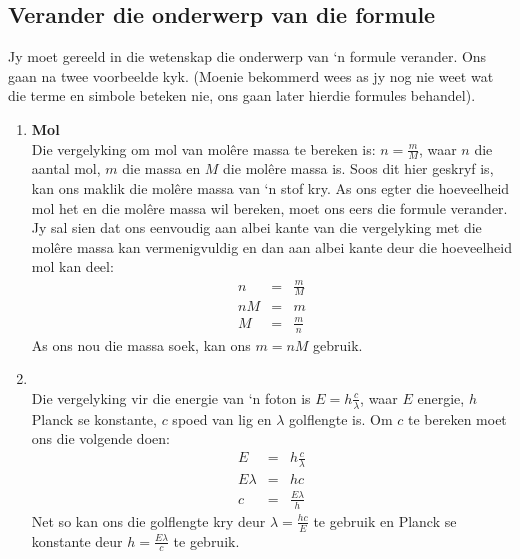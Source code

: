 \subsection*{Verander die onderwerp van die formule}
Jy moet gereeld in die wetenskap die onderwerp van ‘n formule verander. Ons gaan na twee voorbeelde kyk. (Moenie bekommerd wees as jy nog nie weet wat die terme en simbole beteken nie, ons gaan later hierdie formules behandel).
\begin{enumerate}[label=\textbf{\arabic*}.]
 \item \textbf{Mol}\\
Die vergelyking om mol van molêre massa te bereken is: $n = \frac{m}{M}$, waar $n$ die aantal mol, $m$ die massa en $M$ die molêre massa is. Soos dit hier geskryf is, kan ons maklik die molêre massa van ‘n stof kry. As ons egter die hoeveelheid mol het en die molêre massa wil bereken, moet ons eers die formule verander. Jy sal sien dat ons eenvoudig aan albei kante van die vergelyking met die molêre massa kan vermenigvuldig en dan aan albei kante deur die hoeveelheid mol kan deel:
\begin{eqnarray*}
 n & = & \frac{m}{M} \\
nM & = & m \\
M & = & \frac{m}{n}
\end{eqnarray*}
As ons nou die massa soek, kan ons $m = nM$ gebruik.
\item {}\\
Die vergelyking vir die energie van ‘n foton is $E = h\frac{c}{\lambda}$, waar $E$ energie, $h$ Planck se konstante, $c$ spoed van lig en $\lambda$ golflengte is. Om $c$ te bereken moet ons die volgende doen:
\begin{eqnarray*}
 E & = & h\frac{c}{\lambda} \\
E \lambda & = & hc \\
c & = & \frac{E \lambda}{h}
\end{eqnarray*}  
Net so kan ons die golflengte kry deur $\lambda = \frac{hc}{E}$ te gebruik en Planck se konstante deur $h =  \frac{E \lambda}{c}$ te gebruik.
\end{enumerate}
